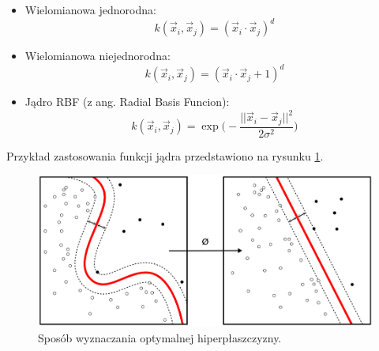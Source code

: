 \begin{itemize}\textsl{}
	\item Wielomianowa jednorodna: 
	\begin{equation}
	k(\vec{x}_i,\vec{x}_j) = (\vec{x}_i \cdot \vec{x}_j)^d
	\end{equation}
	\item Wielomianowa niejednorodna:
	\begin{equation}
	k(\vec{x}_i,\vec{x}_j) = (\vec{x}_i \cdot \vec{x}_j + 1)^d
	\end{equation}
	\item Jądro RBF (z ang. Radial Basis Funcion):
	\begin{equation}
	k(\vec{x}_i,\vec{x}_j) = \exp\bigg( -\frac{||\vec{x}_i - \vec{x}_j||^2}{2\sigma^2}\bigg)
	\end{equation}
\end{itemize}
Przykład zastosowania funkcji jądra przedstawiono na rysunku \ref{im: KernelMachine}.
\begin{figure}[h]
	\includegraphics[width=12cm]{KernelMachine}
	\centering
	\caption{Sposób wyznaczania optymalnej hiperpłaszczyzny.}
	\label{im: KernelMachine}
\end{figure}


















